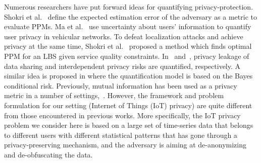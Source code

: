 Numerous researchers have put forward ideas for quantifying privacy-protection. Shokri et al.~\cite{shokri2011quantifying, shokri2011quantifying2} define the expected estimation error of the adversary as a metric to evaluate PPMs.  Ma et al.~\cite{ma2009location} use uncertainty about users' information to quantify user privacy in vehicular networks.
To defeat localization attacks and achieve privacy at the same time, Shokri et al.~\cite{shokri2012protecting} proposed a method which finds optimal PPM for an LBS given service quality constraints.
In~\cite{6li2016privacy} and~\cite{4olteanu2016quantifying}, privacy leakage of data sharing and interdependent privacy risks are quantified, respectively. A similar idea is proposed in \cite{14zhang2014privacy} where the quantification model is based on the Bayes conditional risk. %
Previously, mutual information has been used as a privacy metric in a number of settings,~\cite{kousha3,salamatian2013hide, csiszar1996almost, calmon2015fundamental, sankar2013utility, sankarISIT,sankar, yamamoto1983source, hyposankar}. However, the framework and problem formulation for our setting (Internet of Things (IoT) privacy) are quite different from those encountered in previous works. More specifically, the IoT privacy problem we consider here is based on a large set of time-series data that belongs to different users with different statistical patterns that has gone through a privacy-preserving mechanism, and the adversary is aiming at de-anonymizing and de-obfuscating the data.

